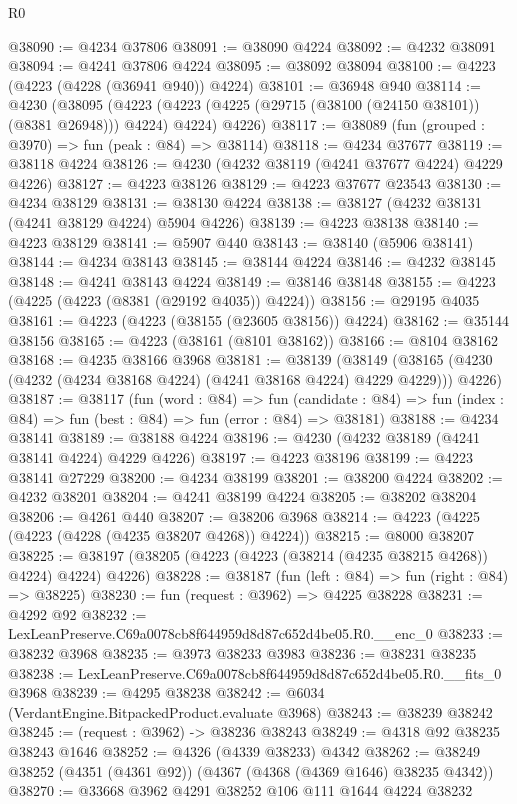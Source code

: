 \begin{lexlean}{R0}
\begin{coremodule}
@38090 := @4234 @37806
@38091 := @38090 @4224
@38092 := @4232 @38091
@38094 := @4241 @37806 @4224
@38095 := @38092 @38094
@38100 := @4223 (@4223 (@4228 (@36941 @940)) @4224)
@38101 := @36948 @940
@38114 := @4230
    (@38095
      (@4223 (@4223 (@4225 (@29715 (@38100 (@24150 @38101)) (@8381 @26948))) @4224) @4224)
      @4226)
@38117 := @38089 (fun (grouped : @3970) => fun (peak : @84) => @38114)
@38118 := @4234 @37677
@38119 := @38118 @4224
@38126 := @4230 (@4232 @38119 (@4241 @37677 @4224) @4229 @4226)
@38127 := @4223 @38126
@38129 := @4223 @37677 @23543
@38130 := @4234 @38129
@38131 := @38130 @4224
@38138 := @38127 (@4232 @38131 (@4241 @38129 @4224) @5904 @4226)
@38139 := @4223 @38138
@38140 := @4223 @38129
@38141 := @5907 @440
@38143 := @38140 (@5906 @38141)
@38144 := @4234 @38143
@38145 := @38144 @4224
@38146 := @4232 @38145
@38148 := @4241 @38143 @4224
@38149 := @38146 @38148
@38155 := @4223 (@4225 (@4223 (@8381 (@29192 @4035)) @4224))
@38156 := @29195 @4035
@38161 := @4223 (@4223 (@38155 (@23605 @38156)) @4224)
@38162 := @35144 @38156
@38165 := @4223 (@38161 (@8101 @38162))
@38166 := @8104 @38162
@38168 := @4235 @38166 @3968
@38181 := @38139
    (@38149 (@38165 (@4230 (@4232 (@4234 @38168 @4224) (@4241 @38168 @4224) @4229 @4229))) @4226)
@38187 := @38117
    (fun (word : @84) =>
    fun (candidate : @84) => fun (index : @84) => fun (best : @84) => fun (error : @84) => @38181)
@38188 := @4234 @38141
@38189 := @38188 @4224
@38196 := @4230 (@4232 @38189 (@4241 @38141 @4224) @4229 @4226)
@38197 := @4223 @38196
@38199 := @4223 @38141 @27229
@38200 := @4234 @38199
@38201 := @38200 @4224
@38202 := @4232 @38201
@38204 := @4241 @38199 @4224
@38205 := @38202 @38204
@38206 := @4261 @440
@38207 := @38206 @3968
@38214 := @4223 (@4225 (@4223 (@4228 (@4235 @38207 @4268)) @4224))
@38215 := @8000 @38207
@38225 := @38197 (@38205 (@4223 (@4223 (@38214 (@4235 @38215 @4268)) @4224) @4224) @4226)
@38228 := @38187 (fun (left : @84) => fun (right : @84) => @38225)
@38230 := fun (request : @3962) => @4225 @38228
@38231 := @4292 @92
@38232 := LexLeanPreserve.C69a0078cb8f644959d8d87c652d4be05.R0.__enc_0
@38233 := @38232 @3968
@38235 := @3973 @38233 @3983
@38236 := @38231 @38235
@38238 := LexLeanPreserve.C69a0078cb8f644959d8d87c652d4be05.R0.__fits_0 @3968
@38239 := @4295 @38238
@38242 := @6034 (VerdantEngine.BitpackedProduct.evaluate @3968)
@38243 := @38239 @38242
@38245 := (request : @3962) -> @38236 @38243
@38249 := @4318 @92 @38235 @38243 @1646
@38252 := @4326 (@4339 @38233) @4342
@38262 := @38249 @38252 (@4351 (@4361 @92)) (@4367 (@4368 (@4369 @1646) @38235 @4342))
@38270 := @33668 @3962 @4291 @38252 @106 @111 @1644 @4224 @38232

\end{coremodule}
\end{lexlean}
